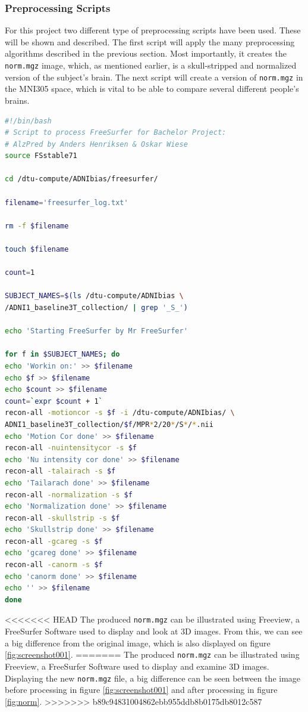 \documentclass[12pt, fleqn, titlepage]{article}
\begin{document}
\subsubsection{Preprocessing Scripts}
For this project two different type of preprocessing scripts have been used. These will be shown and described. The first script will apply the many preprocessing algorithms described in the previous section. Most importantly, it creates the \texttt{norm.mgz} image, which, as mentioned earlier, is a skull-stripped and normalized version of the subject's brain. The next script will create a version of \texttt{norm.mgz} in the MNI305 space, which is vital to be able to compare several different people's brains.

\begin{lstlisting}[language=bash,caption={FreeSurfer Preprocessing}]
#!/bin/bash 
# Script to process FreeSurfer for Bachelor Project:
# AlzPred by Anders Henriksen & Oskar Wiese
source FSstable71

cd /dtu-compute/ADNIbias/freesurfer/

filename='freesurfer_log.txt'

rm -f $filename

touch $filename

count=1

SUBJECT_NAMES=$(ls /dtu-compute/ADNIbias \ 
/ADNI1_baseline3T_collection/ | grep '_S_')

echo 'Starting FreeSurfer by Mr FreeSurfer' 

for f in $SUBJECT_NAMES; do
echo 'Workin on:' >> $filename
echo $f >> $filename
echo $count >> $filename 
count=`expr $count + 1`
recon-all -motioncor -s $f -i /dtu-compute/ADNIbias/ \
ADNI1_baseline3T_collection/$f/MPR*2/20*/S*/*.nii 
echo 'Motion Cor done' >> $filename
recon-all -nuintensitycor -s $f  
echo 'Nu intensity cor done' >> $filename
recon-all -talairach -s $f 
echo 'Tailarach done' >> $filename
recon-all -normalization -s $f 
echo 'Normalization done' >> $filename
recon-all -skullstrip -s $f     
echo 'Skullstrip done' >> $filename
recon-all -gcareg -s $f  
echo 'gcareg done' >> $filename
recon-all -canorm -s $f  
echo 'canorm done' >> $filename
echo '' >> $filename
done 
\end{lstlisting}

\noindent
<<<<<<< HEAD
The produced \texttt{norm.mgz} can be illustrated using Freeview, a FreeSurfer Software used to display and look at 3D images. From this, we can see a big difference from the original image, which is also displayed on figure \ref{fig:screenshot001}.
=======
The produced \texttt{norm.mgz} can be illustrated using Freeview, a FreeSurfer Software used to display and examine 3D images. Displaying the new \texttt{norm.mgz} file, a big difference can be seen between the image before processing in figure \ref{fig:screenshot001} and after processing in figure \ref{fig:norm}.
>>>>>>> b89c94831004862ebb955ddb8b0175db8012c587
\end{document}
